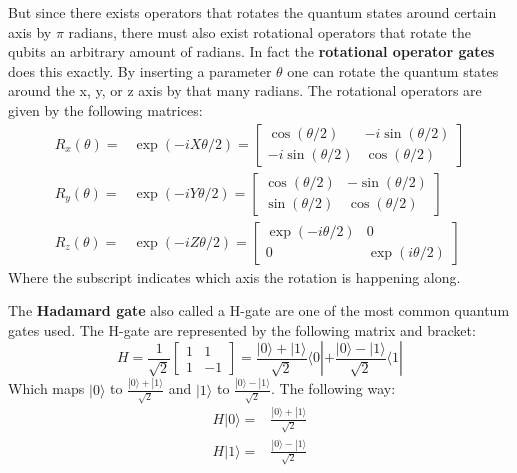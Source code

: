 \documentclass[../main.tex]{subfiles}
\begin{document}
But since there exists operators that rotates the quantum states around certain axis by \ensuremath{\pi} radians, there must also exist rotational operators that rotate the qubits an arbitrary amount of radians. In fact the \textbf{rotational operator gates} does this exactly. By inserting a parameter \ensuremath{\theta} one can rotate the quantum states around the x, y, or z axis by that many radians. The rotational operators are given by the following matrices:
\begin{align}
    R_{x}(\theta)=&\exp (-i X \theta / 2)=\left[\begin{array}{cc}
\cos (\theta / 2) & -i \sin (\theta / 2) \\
-i \sin (\theta / 2) & \cos (\theta / 2)
\end{array}\right]\\
R_{y}(\theta)=&\exp (-i Y \theta / 2)=\left[\begin{array}{cc}
\cos (\theta / 2) & -\sin (\theta / 2) \\
\sin (\theta / 2) & \cos (\theta / 2)
\end{array}\right]\\
R_{z}(\theta)=&\exp (-i Z \theta / 2)=\left[\begin{array}{cc}
\exp (-i \theta / 2) & 0 \\
0 & \exp (i \theta / 2)
\end{array}\right]
\end{align}
Where the subscript indicates which axis the rotation is happening along.

The \textbf{Hadamard gate} also called a H-gate are one of the most common quantum gates used. The H-gate are represented by the following matrix and bracket:
\begin{equation}
    H=\frac{1}{\sqrt{2}}\begin{bmatrix}
    1 & 1\\
    1 & -1
    \end{bmatrix}
    =\frac{|0\rangle+|1\rangle}{\sqrt{2}}\langle0|+\frac{|0\rangle-|1\rangle}{\sqrt{2}}\langle1|
\end{equation}
Which maps \ensuremath{|0\rangle} to \ensuremath{\frac{|0\rangle+|1\rangle}{\sqrt{2}}} and \ensuremath{|1\rangle} to \ensuremath{\frac{|0\rangle-|1\rangle}{\sqrt{2}}}. The following way:
\begin{align}
        H|0\rangle=&\frac{|0\rangle+|1\rangle}{\sqrt{2}}\\
        H|1\rangle=&\frac{|0\rangle-|1\rangle}{\sqrt{2}}
\end{align}
\end{document}
